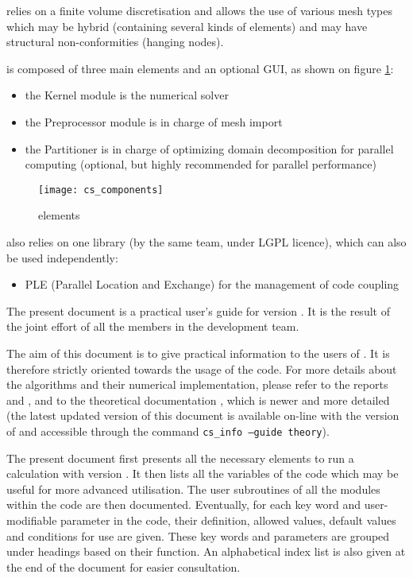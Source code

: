 \CS relies on a finite volume discretisation and allows the use of
various mesh types which may be hybrid (containing several kinds of
elements) and may have structural non-conformities (hanging nodes).


\CS is composed of three main elements and an optional GUI,
as shown on figure \ref{Fig_elements}:
\begin{itemize}
\item the Kernel module is the numerical solver
\item the Preprocessor module is in charge of mesh import
\item the Partitioner is in charge of optimizing domain decomposition
for parallel computing (optional, but highly recommended for parallel
performance)\\
\end{itemize}

\begin{figure}[!h]
\centerline{
\texttt{[image: cs\_components]}}
\caption{\CS elements}\label{Fig_elements}
\end{figure}

\indent\CS also relies on one library (by the same team, under LGPL licence),
which can also be used independently:
\begin{itemize}
\item PLE (Parallel Location and Exchange) for the management of code coupling
\end{itemize}

The present document is a practical user's guide for \CS version \verscs.
It is the result of the joint effort of
all the members in the development team.

The aim of this document is to give practical information to the users of
\CS. It is therefore strictly oriented towards the usage of the code.
For more details about the algorithms and their numerical
implementation, please refer to the reports \cite{mechitoua98} and
\cite{boucker00}, and to the theoretical documentation \cite{theory},
which is newer and more detailed
(the latest updated version of this document
is available on-line with the version of \CS and accessible through the command
\texttt{cs\_info --guide theory}).

The present document first
presents all the necessary elements to run a calculation
with \CS version \verscs. It then lists all the variables of the code
which may be useful for more advanced utilisation.
The user subroutines of all the modules within the code are then documented.
Eventually, for each key word and user-modifiable parameter in the code,
their definition, allowed values, default values and conditions for use are given.
These key words and parameters are grouped under headings
based on their function. An alphabetical index list is also given at the end of
the document for easier consultation.

